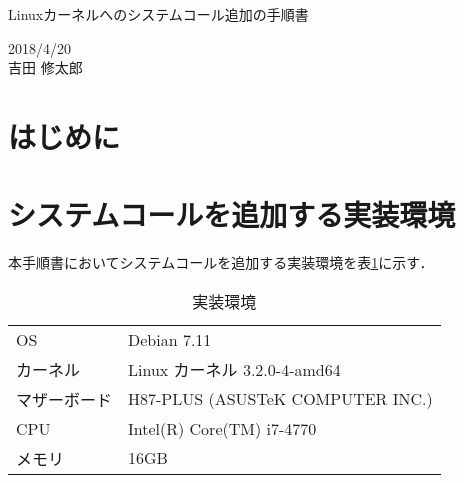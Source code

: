 \documentclass[12pt]{jsarticle}
\begin{document}
\begin{center}
  {\LARGE Linuxカーネルへのシステムコール追加の手順書}
\end{center}

\begin{flushright}
  2018/4/20\\
  吉田 修太郎
\end{flushright}
\section{はじめに}
\section{システムコールを追加する実装環境}\label{sec2}
本手順書においてシステムコールを追加する実装環境を表\ref{table1}に示す．
\begin{table}[h!]
  \begin{center}
    \caption{実装環境}%
    \begin{tabular}{l|l}
      \hline\hline
      OS & Debian 7.11 \\
      カーネル & Linux カーネル 3.2.0-4-amd64 \\
      マザーボード & H87-PLUS (ASUSTeK COMPUTER INC.)\\
      CPU & Intel(R) Core(TM) i7-4770 \\
      メモリ & 16GB\\
      \hline
    \end{tabular}
    \label{table1}
  \end{center}
\end{table}
\end{document}
